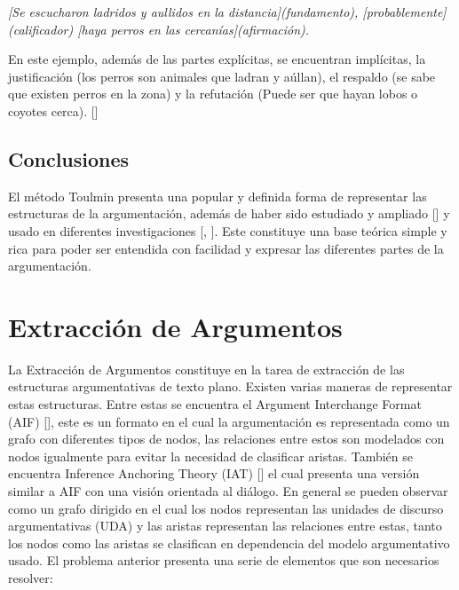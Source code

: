 \emph{[Se escucharon ladridos y aullidos en la distancia](fundamento), [probablemente](calificador) 
[haya perros en las cercanías](afirmación).}

En este ejemplo, además de las partes explícitas, se encuentran implícitas, la justificación 
(los perros son animales que ladran y aúllan), el respaldo (se sabe que existen perros en la zona) y 
la refutación (Puede ser que hayan lobos o coyotes cerca). [\cite{toulminArgument}]

\subsection{Conclusiones}

El método Toulmin presenta una popular y definida forma de representar las estructuras de la argumentación, 
además de haber sido estudiado y ampliado [\cite{freeman2011argument}] y usado en diferentes 
investigaciones [\cite{stab2017parsing}, \cite{niculae2017argument}]. Este constituye una base
teórica simple y rica para poder ser entendida con facilidad y expresar las diferentes partes de la 
argumentación. 

\section{Extracción de Argumentos}


La Extracción de Argumentos constituye en la tarea de extracción de las estructuras argumentativas
de texto plano. Existen varias maneras de representar estas estructuras. Entre estas se encuentra
el Argument Interchange Format (AIF) [\cite{rahwan2009aif}], este es un formato en el cual la argumentación
es representada como un grafo con diferentes tipos de nodos, las relaciones entre estos son modelados con 
nodos igualmente para evitar la necesidad de clasificar aristas. También se encuentra Inference Anchoring Theory 
(IAT) [\cite{corneli2019iat}] el cual presenta una versión similar a AIF con una visión orientada al diálogo.
En general se pueden observar como un grafo dirigido en el cual los nodos representan las unidades de
discurso argumentativas (UDA) y las aristas representan las relaciones entre estas, tanto los nodos como
las aristas se clasifican en dependencia del modelo argumentativo usado.
El problema anterior presenta una serie de elementos que son necesarios resolver:

